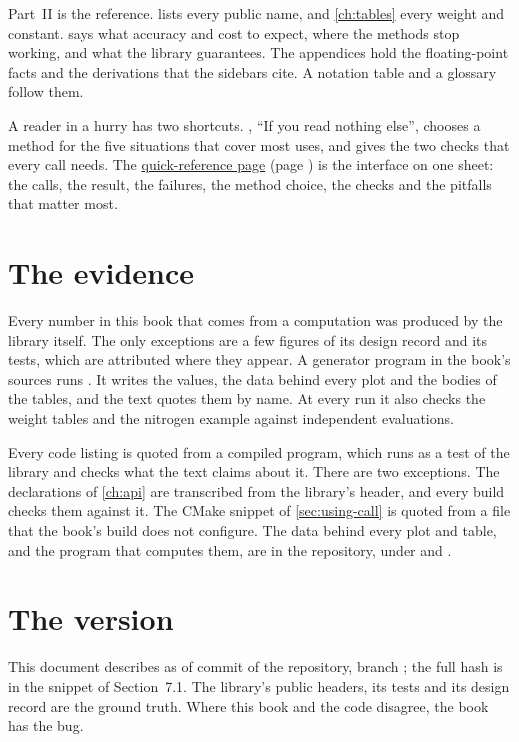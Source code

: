 Part~II is the reference.  lists every public name, and \cref{ch:tables} every weight and constant.
 says what accuracy and cost to expect, where the methods stop working, and what the library
guarantees. The appendices hold the floating-point facts and the derivations that the sidebars cite. A notation table
and a glossary follow them.

A reader in a hurry has two shortcuts. , ``If you read nothing else'', chooses a method for the
five situations that cover most uses, and gives the two checks that every call needs. The
\hyperref[ch:quick-reference]{quick-reference page} (page \pageref{ch:quick-reference}) is the interface on one
sheet: the calls, the result, the failures, the method choice, the checks and the pitfalls that matter most.

\section*{The evidence}

Every number in this book that comes from a computation was produced by the library itself. The only exceptions are
a few figures of its design record and its tests, which are attributed where they appear. A generator program in the
book's sources runs . It writes the values, the data behind every plot and the bodies of the tables,
and the text quotes them by name. At every run it also checks the weight tables and the nitrogen example against
independent evaluations.

Every code listing is quoted from a compiled program, which runs as a test of the library and checks what the text
claims about it. There are two exceptions. The declarations of \cref{ch:api} are transcribed from the library's
header, and every build checks them against it. The CMake snippet of \cref{sec:using-call} is quoted from a file that
the book's build does not configure. The data behind every plot and table, and the program that computes them, are
in the repository, under  and .

\section*{The version}

This document describes  as of commit  of the \nxx{} repository, branch
; the full hash is in the snippet of Section~7.1. The library's public headers, its tests and its design
record are the ground truth. Where this book and the code disagree, the book has the bug.

